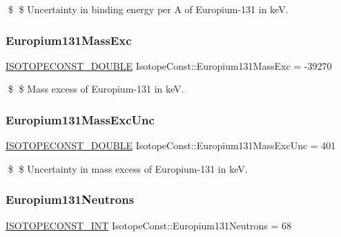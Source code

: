 \$ \$ Uncertainty in binding energy per A of Europium-\/131 in keV. \mbox{\label{group___isotope_const-_europium-_eu131_gaf8d09721fb843676f7e95c020a8d1511}} 
\subsubsection{\texorpdfstring{Europium131\+Mass\+Exc}{Europium131MassExc}}
{\footnotesize\ttfamily \mbox{\hyperlink{group___isotope_const-_macros_ga8f45a7272ce02c0b4c65c44636ed719a}{I\+S\+O\+T\+O\+P\+E\+C\+O\+N\+S\+T\+\_\+\+D\+O\+U\+B\+LE}} Isotope\+Const\+::\+Europium131\+Mass\+Exc = -\/39270}

\$ \$ Mass excess of Europium-\/131 in keV. \mbox{\label{group___isotope_const-_europium-_eu131_gabe03e189f50890663573791475f56f5f}} 
\subsubsection{\texorpdfstring{Europium131\+Mass\+Exc\+Unc}{Europium131MassExcUnc}}
{\footnotesize\ttfamily \mbox{\hyperlink{group___isotope_const-_macros_ga8f45a7272ce02c0b4c65c44636ed719a}{I\+S\+O\+T\+O\+P\+E\+C\+O\+N\+S\+T\+\_\+\+D\+O\+U\+B\+LE}} Isotope\+Const\+::\+Europium131\+Mass\+Exc\+Unc = 401}

\$ \$ Uncertainty in mass excess of Europium-\/131 in keV. \mbox{\label{group___isotope_const-_europium-_eu131_ga86674c530dd8025c4c758211ceafe415}} 
\subsubsection{\texorpdfstring{Europium131\+Neutrons}{Europium131Neutrons}}
{\footnotesize\ttfamily \mbox{\hyperlink{group___isotope_const-_macros_ga5f18360b3e99483a35c32d789e62621c}{I\+S\+O\+T\+O\+P\+E\+C\+O\+N\+S\+T\+\_\+\+I\+NT}} Isotope\+Const\+::\+Europium131\+Neutrons = 68}

